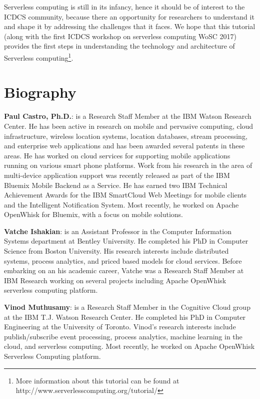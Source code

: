 \documentclass[conference]{IEEEtran}
\begin{document}
Serverless computing is still in its infancy, hence it should be of interest to the ICDCS community, because there an opportunity for researchers to understand it and shape it by addressing the challenges that it faces. We hope that this tutorial (along with the first ICDCS workshop on serverless computing WoSC 2017) provides the first steps in understanding the technology and architecture of Serverless computing\footnote{More information about this tutorial can be found at http://www.serverlesscomputing.org/tutorial/}.

\section{Biography}
{\noindent \bf Paul Castro, Ph.D.}: is a Research Staff Member at the IBM Watson Research Center. He has been active in research on mobile and pervasive computing, cloud infrastructure, wireless location systems, location databases, stream processing, and enterprise web applications and has been awarded several patents in these areas. He has worked on cloud services for supporting mobile applications running on various smart phone platforms. Work from his research in the area of multi-device application support was recently released as part of the IBM Bluemix Mobile Backend as a Service. He has earned two IBM Technical Achievement Awards for the IBM SmartCloud Web Meetings for mobile clients and the Intelligent Notification System. Most recently, he worked on Apache OpenWhisk for Bluemix, with a focus on mobile solutions.

\smallbreak

{\noindent \bf Vatche Ishakian}: is an Assistant Professor in the Computer Information Systems department at Bentley University. He completed his PhD in Computer Science from Boston University. His research interests include distributed systems, process analytics, and priced based models for cloud services. Before embarking on an his academic career, Vatche was a Research Staff Member at IBM Research working on several projects including Apache OpenWhisk serverless computing platform.

\smallbreak

{\noindent \bf Vinod Muthusamy}: is a Research Staff Member in the Cognitive Cloud group at the IBM T.J. Watson Research Center. He completed his PhD in Computer Engineering at the University of Toronto. Vinod's research interests include publish/subscribe event processing, process analytics, machine learning in the cloud, and serverless computing. Most recently, he worked on Apache OpenWhisk Serverless Computing platform.
\end{document}
